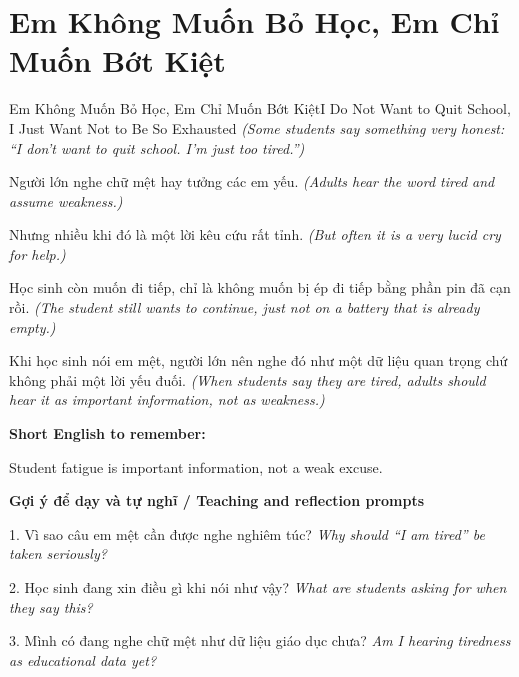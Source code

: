 \section{Em Không Muốn Bỏ Học, Em Chỉ Muốn Bớt Kiệt}
\begin{truyen}{Em Không Muốn Bỏ Học, Em Chỉ Muốn Bớt Kiệt}{I Do Not Want to Quit School, I Just Want Not to Be So Exhausted}
\textit{(Some students say something very honest: “I don't want to quit school. I'm just too tired.”)}

Người lớn nghe chữ mệt hay tưởng các em yếu.
\textit{(Adults hear the word tired and assume weakness.)}

Nhưng nhiều khi đó là một lời kêu cứu rất tỉnh.
\textit{(But often it is a very lucid cry for help.)}

Học sinh còn muốn đi tiếp, chỉ là không muốn bị ép đi tiếp bằng phần pin đã cạn rồi.
\textit{(The student still wants to continue, just not on a battery that is already empty.)}

\end{truyen}

\begin{baihoc}
Khi học sinh nói em mệt, người lớn nên nghe đó như một dữ liệu quan trọng chứ không phải một lời yếu đuối.
\textit{(When students say they are tired, adults should hear it as important information, not as weakness.)}
\end{baihoc}

\begin{ghinhoanh}
\textbf{Short English to remember:}

Student fatigue is important information, not a weak excuse.

\end{ghinhoanh}

\begin{tuhocnhanh}
\textbf{Gợi ý để dạy và tự nghĩ / Teaching and reflection prompts}

1. Vì sao câu em mệt cần được nghe nghiêm túc? \textit{Why should “I am tired” be taken seriously?}

2. Học sinh đang xin điều gì khi nói như vậy? \textit{What are students asking for when they say this?}

3. Mình có đang nghe chữ mệt như dữ liệu giáo dục chưa? \textit{Am I hearing tiredness as educational data yet?}
\end{tuhocnhanh}
